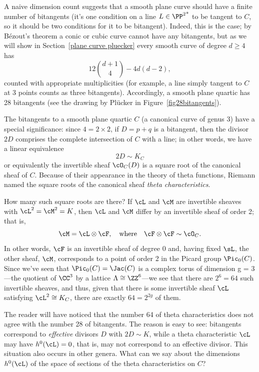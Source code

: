 A naive dimension count suggests that a smooth plane curve should have a finite number of bitangents (it's one condition on a line $L \in {\PP^2}^*$ to be tangent to $C$, so it should be two conditions for it to be bitangent). Indeed, this is the case; by B\'ezout's theorem a conic or cubic curve cannot have any bitangents, but as we will show in Section~\ref{plane curve pluecker} every smooth curve of degree $d \geq 4$ has 
$$
12\binom{d+1}{4} - 4d(d-2),
$$
counted with appropriate multiplicities (for example, a line simply tangent to $C$ at 3 points  counts as three bitangents). Accordingly, a smooth plane quartic has 28 bitangents (see the drawing by Pl\"ucker in Figure~\ref{fig28bitangents}).

The bitangents to a smooth plane quartic $C$ (a canonical curve of genus 3) have a special significance: since $4 = 2 \times 2$, if $D = p+q$ is a bitangent, then the divisor $2D$ comprises the complete intersection of $C$ with a line; in other words, we have a linear equivalence
$$
2D \sim K_C
$$
or equivalently the invertible sheaf $\cO_C(D)$ is a square root of the canonical sheaf of $C$. Because of their appearance in the theory of theta functions, Riemann named the square roots of the canonical sheaf \emph{theta characteristics}.

How many such square roots are there? If $\cL$ and $\cM$ are invertible sheaves with $\cL^2 = \cM^2 = K$, then $\cL$ and $\cM$ differ by an invertible sheaf of order 2; that is,
$$
\cM = \cL \otimes \cF, \quad \text{where} \quad \cF \otimes \cF \sim \cO_C.
$$
In other words, $\cF$ is an invertible sheaf of degree 0 and, having fixed $\sL$,  the other sheaf, $\cM$, corresponds to a point of order 2 in the Picard group $\Pic_0(C)$. Since we've seen that $\Pic_0(C) = \Jac(C)$ is a complex torus of dimension g = 3---the quotient of $\CC^3$ by a lattice $\Lambda \cong \ZZ^6$---we see that there are $2^6 = 64$ such invertible sheaves, and thus, given that there is some invertible sheaf $\cL$ satisfying $\cL^2 \cong K_C$, there are exactly $64 = 2^{2g}$ of them.

  
The reader will have noticed that the number 64 of theta characteristics does not agree with the number 28 of bitangents. The reason is easy to see: bitangents correspond to \emph{effective} divisors $D$ with $2D \sim K$, while a theta characteristic $\cL$ may have $h^0(\cL) = 0$, that is, may not correspond to an effective divisor. 
This situation also occurs in other genera. 
What can we say about the dimensions $h^0(\cL)$ of the space of sections of the theta characteristics on $C$?
 
